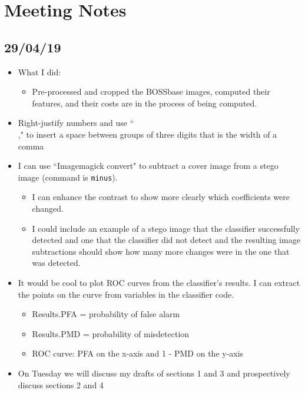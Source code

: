 \documentclass[11pt,a4paper]{report}
\begin{document}
\chapter{Meeting Notes}

\section{29/04/19}

\begin{itemize}

  \item What I did:
    \begin{itemize}
      \item Pre-processed and cropped the BOSSbase images, computed their features, and their costs are in the process of being computed.
    \end{itemize}

  \item Right-justify numbers and use ``\\," to insert a space between groups of three digits that is the width of a comma

  \item I can use ``Imagemagick convert" to subtract a cover image from a stego image (command is \texttt{minus}).
  \begin{itemize}
      \item I can enhance the contrast to show more clearly which coefficients were changed.
      \item I could include an example of a stego image that the classifier successfully detected and one that the classifier did not detect and the resulting image subtractions should show how many more changes were in the one that was detected.
  \end{itemize}
  
  \item It would be cool to plot ROC curves from the classifier's results. I can extract the points on the curve from variables in the classifier code.
  \begin{itemize}
      \item Results.PFA = probability of false alarm
      \item Results.PMD = probability of misdetection
      \item ROC curve: PFA on the x-axis and 1 - PMD on the y-axis
  \end{itemize}

  \item On Tuesday we will discuss my drafts of sections 1 and 3 and prospectively discuss sections 2 and 4
  

\end{itemize}
\end{document}
